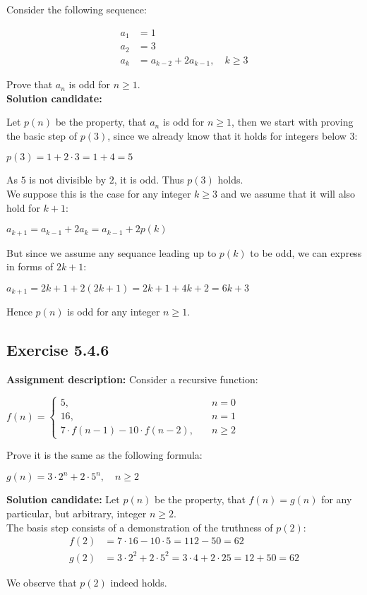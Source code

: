 \documentclass{report}
\newcommand{\cent}[1]{\begin{center}#1\end{center}}
\newcommand{\mAlign}[1]{\begin{align*}#1\end{align*}}
\newcommand{\stackedFunc}[3]{
	\begin{cases}
		#1 \\
		#2 \\
		#3
	\end{cases}}
\newcommand{\assignmentDescription}{\textbf{Assignment description: }}
\newcommand{\solution}{\textbf{Solution candidate: }}
\newcommand{\QED}{\boxed{}}
\newcommand{\Exercise}[1]{\subsection{Exercise #1}}
\begin{document}
 	Consider the following sequence:
 	
 	\mAlign{
 		a_1 &= 1 \\
 		a_2 &= 3 \\
 		a_k &= a_{k-2} + 2 a_{k-1}, \quad k \geq 3
 	}
 
 	Prove that $a_n$ is odd for $n \geq 1$.\\
 	
 	\solution
 	
 	Let $p(n)$ be the property, that  $a_n$ is odd for $n \geq 1$, then we start with proving the basic step of $p(3)$, since we already know that it holds for integers below 3:
 	
 	\cent{$p(3) = 1 + 2 \cdot 3 = 1+ 4= 5$}
 	
 	As $5$ is not divisible by $2$, it is odd. Thus $p(3)$ holds.\\
 	
 	We suppose this is the case for any integer $k \geq 3$ and we assume that it will also hold for $k+1$:
 	
 	\cent{$a_{k+1} = a_{k-1} +2 a_k = a_{k-1} +2 p(k)$}
 	
 	But since we assume any sequance leading up to $p(k)$ to be odd, we can express in forms of $2k+1$:
 	
 	\cent{$a_{k+1} = 2k+1 + 2(2k+1) = 2k+1+4k+2 = 6k+3$}
 	
 	Hence $p(n)$ is odd for any integer $n\geq 1$.\\
 	\QED
 	
 	\Exercise{5.4.6}
 	
 	\assignmentDescription
 	Consider a recursive function:
 	
 	\cent{$f(n) = \stackedFunc{5, \quad &n = 0}{16, \quad &n=1}{7 \cdot  f(n-1) - 10 \cdot f(n-2),\quad &n \geq 2}$}
 	
 	Prove it is the same as the following formula:
 	
 	\cent{$g(n) = 3 \cdot 2^n + 2 \cdot 5^n, \quad n \geq 2$}
 	
 	\solution
 	Let $p(n)$ be the property, that $f(n) = g(n)$ for any particular, but arbitrary, integer $n \geq 2$.\\
 	
 	The basis step consists of a demonstration of the truthness of $p(2)$:
 	\mAlign{
 		f(2) &= 7 \cdot 16 - 10 \cdot 5 = 112 - 50 = 62 \\
 		g(2) &= 3 \cdot 2^2 + 2 \cdot 5^2 = 3 \cdot 4 + 2 \cdot 25 = 12 + 50 = 62
 	}
 
 	We observe that $p(2)$ indeed holds.\\
 	
\end{document}

